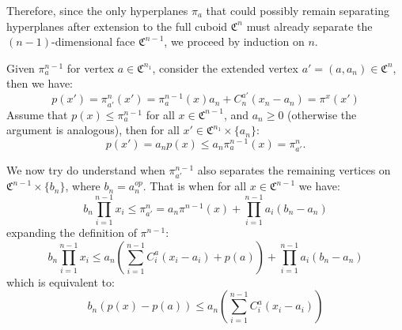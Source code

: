 \documentclass{article}
\begin{document}
\noindent
Therefore, since the only hyperplanes $\pi_a$ that could possibly remain separating hyperplanes after extension to the full cuboid $\mathfrak{C}^n$ must already 
separate the $(n-1)$-dimensional face $\mathfrak{C}^{n-1}$, we proceed by induction on $n$.
\par
Given \(\pi^{n-1}_{a}\) for vertex \(a \in \mathfrak{C}^{n_1}\), consider the extended vertex \(a'=(a,a_n) \in \mathfrak{C}^{n}\), 
then we have:
\[
p(x')=\pi^{n}_{a'}(x')= \pi_a^{n-1}(x)a_n+ C^{a'}_n (x_n-a_n)=\pi^x(x')
\]
Assume that \(p(x) \leq \pi_{a}^{n-1}\) for all \(x \in \mathfrak{C}^{n-1}\), and \(a_n \geq 0\) (otherwise the argument is analogous), then for all \(x' \in \mathfrak{C}^{n_1} \times \{a_n\}\):
\[
p(x') = a_n p(x) \leq a_n \pi_{a}^{n-1}(x) = \pi_{a'}^n.
\]

We now try do understand when \(\pi^{n-1}_{a'}\) also separates the remaining vertices on \(\mathfrak{C}^{n-1} \times \{b_n\}\), where \(b_n = a^{op}_n\).
%
 That is when for all \(x \in \mathfrak{C}^{n-1}\) we have:
\[
b_n\prod_{i=1}^{n-1}x_i \leq \pi^{n}_{a'} = a_n \pi^{n-1}(x) + \prod_{i=1}^{n-1}a_i(b_n-a_n)
\]
expanding the definition of \(\pi^{n-1}\):
\[
	b_n\prod_{i=1}^{n-1}x_i \leq a_n (\sum_{i=1}^{n-1}C_i^a(x_i-a_i) + p(a)) + \prod_{i=1}^{n-1}a_i(b_n-a_n)
\]
which is equivalent to:
\begin{equation}
\label{eq: hyperplane extension}
b_n(p(x)-p(a)) \leq a_n(\sum_{i=1}^{n-1}C_i^a(x_i-a_i))
\end{equation}
\end{document}
